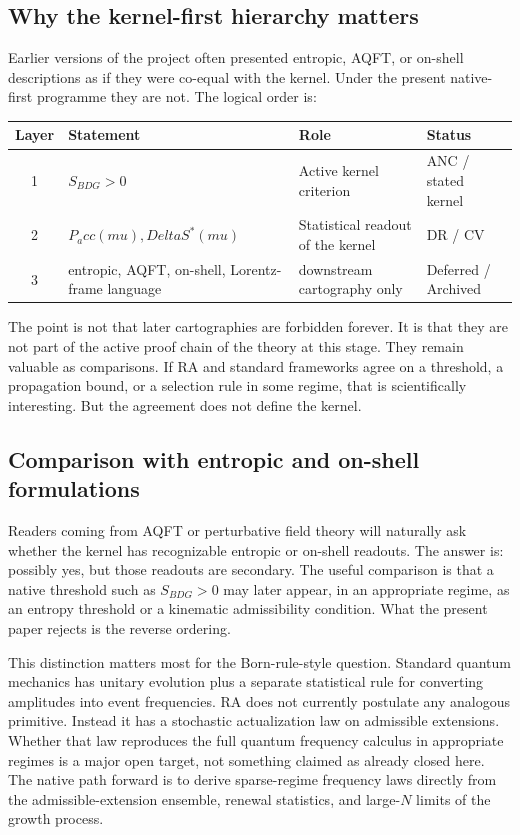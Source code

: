 \documentclass[11pt]{article}
\def\Delta{Delta}%
\def\mu{mu}%
\def\mathrm#1{#1}%
\def\Pacc{P_acc}%
\newcommand{\Pacc}{P_{\mathrm{acc}}}
\begin{document}
\subsection{Why the kernel-first hierarchy matters}

Earlier versions of the project often presented entropic, AQFT, or on-shell descriptions as if they were co-equal with the kernel. Under the present native-first programme they are not. The logical order is:
\begin{center}
\begin{tabular}{clll}
\toprule
Layer & Statement & Role & Status \\
\midrule
1 & $S_{\mathrm{BDG}} > 0$ & Active kernel criterion & ANC / stated kernel \\
2 & $\Pacc(\mu), \Delta S^*(\mu)$ & Statistical readout of the kernel & DR / CV \\
3 & entropic, AQFT, on-shell, Lorentz-frame language & downstream cartography only & Deferred / Archived \\
\bottomrule
\end{tabular}
\end{center}

The point is not that later cartographies are forbidden forever. It is that they are not part of the active proof chain of the theory at this stage. They remain valuable as comparisons. If RA and standard frameworks agree on a threshold, a propagation bound, or a selection rule in some regime, that is scientifically interesting. But the agreement does not define the kernel.

\subsection{Comparison with entropic and on-shell formulations}

Readers coming from AQFT or perturbative field theory will naturally ask whether the kernel has recognizable entropic or on-shell readouts. The answer is: possibly yes, but those readouts are secondary. The useful comparison is that a native threshold such as $S_{\mathrm{BDG}}>0$ may later appear, in an appropriate regime, as an entropy threshold or a kinematic admissibility condition. What the present paper rejects is the reverse ordering.

This distinction matters most for the Born-rule-style question. Standard quantum mechanics has unitary evolution plus a separate statistical rule for converting amplitudes into event frequencies. RA does not currently postulate any analogous primitive. Instead it has a stochastic actualization law on admissible extensions. Whether that law reproduces the full quantum frequency calculus in appropriate regimes is a major open target, not something claimed as already closed here. The native path forward is to derive sparse-regime frequency laws directly from the admissible-extension ensemble, renewal statistics, and large-$N$ limits of the growth process.
\end{document}
